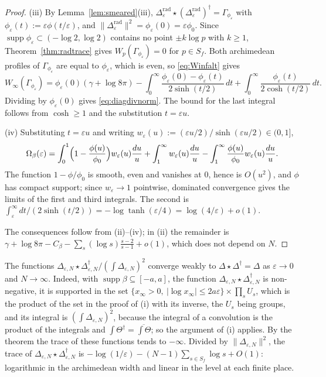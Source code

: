 \documentclass[11pt]{amsart}
\theoremstyle{definition}
\newcommand{\supp}{\operatorname{supp}}
\begin{document}
\begin{proof}
(iii) By Lemma~\ref{lem:smeared}(iii),
$\Delta^{\mathrm{rad}}_\varepsilon\star
(\Delta^{\mathrm{rad}}_\varepsilon)^\dagger=\Gamma_{\phi_\varepsilon}$
with $\phi_\varepsilon(t):=\varepsilon\phi(t/\varepsilon)$, and
$\|\Delta^{\mathrm{rad}}_\varepsilon\|^2=\phi_\varepsilon(0)
=\varepsilon\phi_0$. Since
$\supp\phi_\varepsilon\subset(-\log2,\log2)$ contains no point
$\pm k\log p$ with $k\ge1$, Theorem~\ref{thm:radtrace} gives
$W_p(\Gamma_{\phi_\varepsilon})=0$ for $p\in S_f$. Both archimedean
profiles of $\Gamma_{\phi_\varepsilon}$ are equal to
$\phi_\varepsilon$, which is even, so \eqref{eq:Winfalt} gives
\[
  W_\infty(\Gamma_{\phi_\varepsilon})
   =\phi_\varepsilon(0)(\gamma+\log8\pi)
   -\int_0^\infty\frac{\phi_\varepsilon(0)-\phi_\varepsilon(t)}
     {2\sinh(t/2)}\,dt
   +\int_0^\infty\frac{\phi_\varepsilon(t)}{2\cosh(t/2)}\,dt .
\]
Dividing by $\phi_\varepsilon(0)$ gives \eqref{eq:diagdivnorm}. The
bound for the last integral follows from $\cosh\ge1$ and the substitution
$t=\varepsilon u$.

(iv) Substituting $t=\varepsilon u$ and writing
$w_\varepsilon(u):=(\varepsilon u/2)/\sinh(\varepsilon u/2)\in(0,1]$,
\[
  \Omega_\beta(\varepsilon)=\int_0^1\Bigl(1-\frac{\phi(u)}{\phi_0}\Bigr)
   w_\varepsilon(u)\frac{du}u+\int_1^\infty w_\varepsilon(u)\frac{du}u
   -\int_1^\infty\frac{\phi(u)}{\phi_0}w_\varepsilon(u)\frac{du}u .
\]
The function $1-\phi/\phi_0$ is smooth, even and vanishes at $0$, hence
is $O(u^2)$, and $\phi$ has compact support; since $w_\varepsilon\to1$
pointwise, dominated convergence gives the limits of the first and third
integrals. The second is
$\int_\varepsilon^\infty dt/(2\sinh(t/2))=-\log\tanh(\varepsilon/4)
=\log(4/\varepsilon)+o(1)$.

The consequences follow from (ii)--(iv); in (ii) the remainder is
$\gamma+\log8\pi-C_\beta-\sum_s(\log s)\tfrac{s-2}{s-1}+o(1)$, which does
not depend on $N$.
\end{proof}

The functions
$\Delta_{\varepsilon,N}\star\Delta_{\varepsilon,N}^\dagger/
(\int\Delta_{\varepsilon,N})^2$ converge weakly to
$\Delta\star\Delta^\dagger=\Delta$ as $\varepsilon\to0$ and $N\to\infty$.
Indeed, with $\supp\beta\subseteq[-a,a]$, the function
$\Delta_{\varepsilon,N}\star\Delta_{\varepsilon,N}^\dagger$ is non-negative,
it is supported in the set
$\{x_\infty>0,\ |\log x_\infty|\le2a\varepsilon\}\times\prod_sU_s$, which is
the product of the set in the proof of (i) with its inverse, the $U_s$ being
groups, and its integral is $(\int\Delta_{\varepsilon,N})^2$, because the
integral of a convolution is the product of the integrals and
$\int\Theta^\dagger=\overline{\int\Theta}$; so the argument of (i) applies.
By the theorem the trace of these functions tends to $-\infty$. Divided by
$\|\Delta_{\varepsilon,N}\|^2$, the trace of
$\Delta_{\varepsilon,N}\star\Delta_{\varepsilon,N}^\dagger$ is
$-\log(1/\varepsilon)-(N-1)\sum_{s\in S_f}\log s+O(1)$: logarithmic in the
archimedean width and linear in the level at each finite place.
\end{document}
